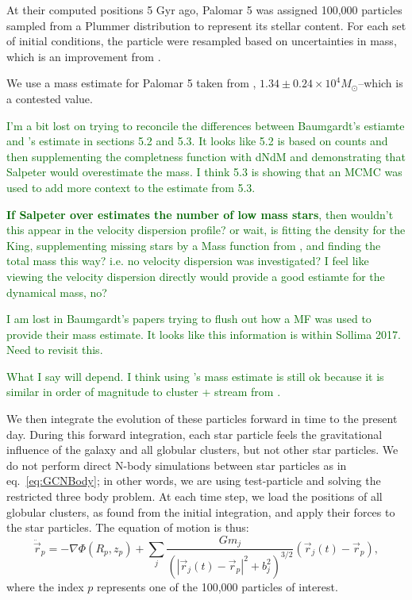 \documentclass{aa}
\newcommand{\salvatore}[1]{\textcolor{darkgreen}{{#1}}}
\begin{document}
    At their computed positions 5 Gyr ago, Palomar 5 was assigned 100,000 particles sampled from a Plummer distribution to represent its stellar content. For each set of initial conditions, the particle were resampled based on uncertainties in mass, which is an improvement from \citet{2023A&A...673A..44F}. 

    We use a mass estimate for Palomar 5 taken from \citet{2021MNRAS.505.5957B}, $1.34\pm0.24\times10^{4}M_{\odot}$--which is a contested value. 
    
    \salvatore{I'm a bit lost on trying to reconcile the differences between Baumgardt's estiamte and \citet{2017ApJ...842..120I}'s estimate in sections 5.2 and 5.3. It looks like 5.2 is based on counts and then supplementing the completness function with dNdM \citet{2001AJ....122.3231G} and demonstrating that Salpeter would overestimate the mass. I think 5.3 is showing that an MCMC was used to add more context to the estimate from 5.3.}
    
    \salvatore{\textbf{If Salpeter over estimates the number of low mass stars}, then wouldn't this appear in the velocity dispersion profile? or wait, is \citet{2017ApJ...842..120I} fitting the density for the King, supplementing missing stars by a Mass function from \citet{2001AJ....122.3231G}, and finding the total mass this way? i.e. no velocity dispersion was investigated? I feel like viewing the velocity dispersion directly would provide a good estiamte for the dynamical mass, no?}
    
    \salvatore{I am lost in Baumgardt's papers trying to flush out how a MF was used to provide their mass estimate. It looks like this information is within Sollima 2017. Need to revisit this. }

    \salvatore{What I say will depend. I think using \citet{2021MNRAS.505.5957B}'s mass estimate is still ok because it is similar in order of magnitude to cluster + stream from \citet{2017ApJ...842..120I}. }


    We then integrate the evolution of these particles forward in time to the present day. During this forward integration, each star particle feels the gravitational influence of the galaxy and all globular clusters, but not other star particles. We do not perform direct N-body simulations between star particles as in eq.~\ref{eq:GCNBody}; in other words, we are using test-particle and solving the restricted three body problem. At each time step, we load the positions of all globular clusters, as found from the initial integration, and apply their forces to the star particles. The equation of motion is thus: 
    \begin{equation}
      \ddot{\vec{r}}_p = -\nabla \Phi(R_p,z_p) + \left.\sum_{j} \frac{Gm_j}{\left(|\vec{r}_j(t) - \vec{r}_p|^2 + b_j^2\right)^{3/2}}\right. \left(\vec{r}_j(t)- \vec{r}_p\right),
      \end{equation} \label{eq:equation_of_motion_particle} where the index $p$ represents one of the 100,000 particles of interest.
\end{document}
